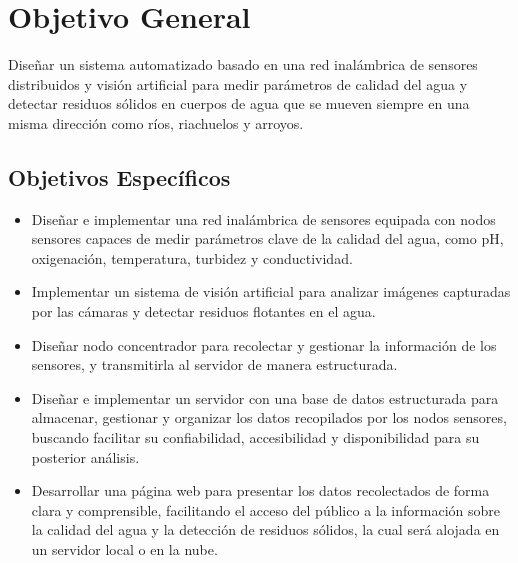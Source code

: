 \section{Objetivo General}
\label{sec:objetivos}
Diseñar un sistema automatizado basado en una red inalámbrica de sensores distribuidos y visión artificial para medir parámetros de calidad del agua y detectar residuos sólidos en cuerpos de agua que se mueven siempre en una misma dirección como ríos, riachuelos y arroyos.


\subsection{Objetivos Específicos}
\begin{itemize}

  \item Diseñar e implementar una red inalámbrica de sensores equipada con nodos sensores capaces de medir parámetros clave de la calidad del agua, como pH, oxigenación, temperatura, turbidez y conductividad.

  \item Implementar un sistema de visión artificial para analizar imágenes capturadas por las cámaras y detectar residuos flotantes en el agua.
  \item Diseñar nodo concentrador para recolectar y gestionar la información de los sensores, y transmitirla al servidor de manera estructurada.

  \item Diseñar e implementar un servidor con una base de datos estructurada para almacenar, gestionar y organizar los datos recopilados por los nodos sensores, buscando facilitar su confiabilidad, accesibilidad y disponibilidad para su posterior análisis.

  \item Desarrollar una página web para presentar los datos recolectados de forma clara y comprensible, facilitando el acceso del público a la información sobre la calidad del agua y la detección de residuos sólidos, la cual será alojada en un servidor local o en la nube.

\end{itemize}
